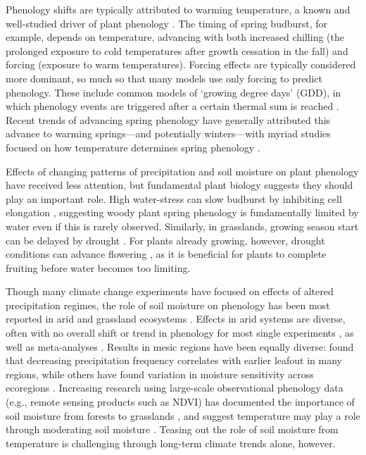 \documentclass{article}
\begin{document}
\par Phenology shifts are typically attributed to warming temperature, a known and well-studied driver of plant phenology \citep[e.g.,][]{cleland2007, piao2019plant}. The timing of spring budburst, for example, depends on temperature, advancing with both increased chilling (the prolonged exposure to cold temperatures after growth cessation in the fall) and forcing (exposure to warm temperatures). Forcing effects are typically considered more dominant, so much so that many models use only forcing to predict phenology. These include common models of `growing degree days' (GDD), in which phenology events are triggered after a certain thermal sum is reached \citep[e.g., ][]{olsson2014process}. Recent trends of advancing spring phenology have generally attributed this advance to warming springs---and potentially winters---with myriad studies focused on how temperature determines spring phenology \citep{fujisawa2010, ibanez2010,cook2012b}.


\par Effects of changing patterns of precipitation and soil moisture on plant phenology have received less attention, but fundamental plant biology suggests they should play an important role. High water-stress can slow budburst by inhibiting cell elongation \citep{essiamah1986}, suggesting woody plant spring phenology is fundamentally limited by water even if this is rarely observed. Similarly, in grasslands, growing season start can be delayed by drought \cite{cui2017}. For plants already growing, however, drought conditions can advance flowering  \citep{hamann2018}, as it is beneficial for plants to complete fruiting before water becomes too limiting. 

Though many climate change experiments have focused on effects of altered precipitation regimes, the role of soil moisture on phenology has been most reported in arid and grassland ecosystems \citep[e.g., ][]{essiamah1986,reich1984, van1993, tao2019}. Effects in arid systems are diverse, often with no overall shift or trend in phenology for most single experiments \citep[e.g.,][]{sherry2007,de2017challenging,howell2020}, as well as meta-analyses \citep{lu2023contrasting}. Results in mesic regions have been equally diverse: \citet{wang2022} found that decreasing precipitation frequency correlates with earlier leafout in many regions, while others have found variation in moisture sensitivity across ecoregions \citep{seyed2018}. Increasing research using large-scale observational phenology data (e.g., remote sensing products such as NDVI) has documented the importance of soil moisture from forests to grasslands \citep{lian2020summer,shen2022plant,liu2024soil}, and suggest temperature may play a role through moderating soil moisture \citep{liu2024soil}. Teasing out the role of soil moisture from temperature is challenging through long-term climate trends alone, however. 
\end{document}

